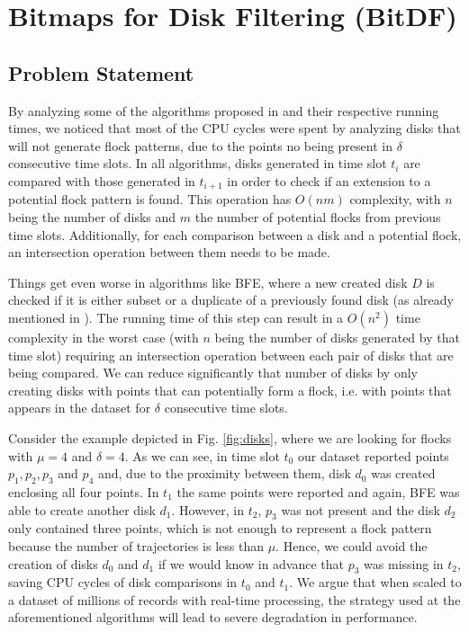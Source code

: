 \chapter{\textbf{Bit}maps for \textbf{D}isk \textbf{F}iltering (BitDF)}
\label{chp:algorithm}
\section{Problem Statement}
By analyzing some of the algorithms proposed in  and their respective running times, we noticed
that most of the CPU cycles were spent by analyzing disks that will not generate flock patterns, due to the points no
being present in $\delta$ consecutive time slots. In all algorithms, disks generated in time slot $t_i$ are compared
with those generated in $t_{i+1}$ in order to check if an extension to a potential flock pattern is found. This
operation has $O(nm)$ complexity, with $n$ being the number of disks and $m$ the number of potential flocks from
previous time slots.  Additionally, for each comparison between a disk and a potential flock, an intersection operation
between them needs to be made.

Things get even worse in algorithms like BFE, where a new created disk $D$ is checked if it is either subset or a
duplicate of a previously found disk (as already mentioned in ). The running time of this
step can result in a $O(n^2)$ time complexity in the worst case (with $n$ being the number of disks generated by that
time slot) requiring an intersection operation between each pair of disks that are being compared. We can reduce
significantly that number of disks by only creating disks with points that can potentially form a flock, i.e. with
points that appears in the dataset for $\delta$ consecutive time slots.

Consider the example depicted in Fig. \ref{fig:disks}, where we are looking for flocks with $\mu=4$ and $\delta=4$. As
we can see, in time slot $t_0$ our dataset reported points $p_1,p_2,p_3$ and $p_4$ and, due to the proximity between
them, disk $d_0$ was created enclosing all four points. In $t_1$ the same points were reported and again, BFE was able
to create another disk $d_1$. However, in $t_2$, $p_3$ was not present and the disk $d_2$ only contained three points,
which is not enough to represent a flock pattern because the number of trajectories is less than $\mu$. Hence, we could
avoid the creation of disks $d_0$ and $d_1$ if we would know in advance that $p_3$ was missing in $t_2$, saving CPU
cycles of disk comparisons in $t_0$ and $t_1$. We argue that when scaled to a dataset of millions of records with
real-time processing, the strategy used at the aforementioned algorithms will lead to severe degradation in performance.

